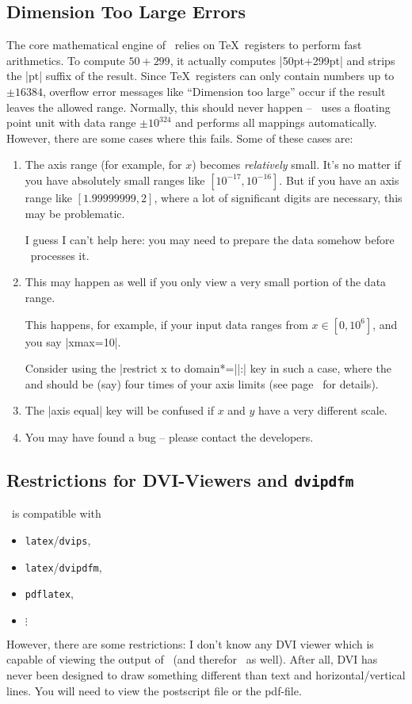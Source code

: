 \subsection{Dimension Too Large Errors}
The core mathematical engine of \PGF\ relies on \TeX\ registers to perform fast arithmetics. To compute $50+299$, it actually computes |50pt+299pt| and strips the |pt| suffix of the result. Since \TeX\ registers can only contain numbers up to $\pm 16384$, overflow error messages like ``Dimension too large'' occur if the result leaves the allowed range. Normally, this should never happen -- \PGFPlots\ uses a floating point unit with data range $\pm 10^{324}$ and performs all mappings automatically. However, there are some cases where this fails. Some of these cases are:
\begin{enumerate}
	\item The axis range (for example, for $x$) becomes \emph{relatively} small. It's no matter if you have absolutely small ranges like $[10^{-17},10^{-16}]$. But if you have an axis range like $[1.99999999,2]$, where a lot of significant digits are necessary, this may be problematic.

	I guess I can't help here: you may need to prepare the data somehow before \PGFPlots\ processes it.

	\item This may happen as well if you only view a very small portion of the data range.

	This happens, for example, if your input data ranges from $x\in [0,10^6]$, and you say |xmax=10|.

	Consider using the |restrict x to domain*=||:| key in such a case, where the  and  should be (say) four times of your axis limits (see page~\pageref{key:restrict:x:to:domain} for details).
		
	\item The |axis equal| key will be confused if $x$ and $y$ have a very different scale.
	\item You may have found a bug -- please contact the developers.
\end{enumerate}

\subsection{Restrictions for DVI-Viewers and \texttt{dvipdfm}}
\label{sec:drivers}%
\PGF\ is compatible with 
\begin{itemize}
	\item \lstinline!latex!/\lstinline!dvips!,
	\item \lstinline!latex!/\lstinline!dvipdfm!,
	\item \lstinline!pdflatex!,
	\item $\vdots$
\end{itemize}
However, there are some restrictions: I don't know any DVI viewer which is capable of viewing the output of \PGF\ (and therefor \PGFPlots\ as well). After all, DVI has never been designed to draw something different than text and horizontal/vertical lines. You will need to view the postscript file or the pdf-file. 

